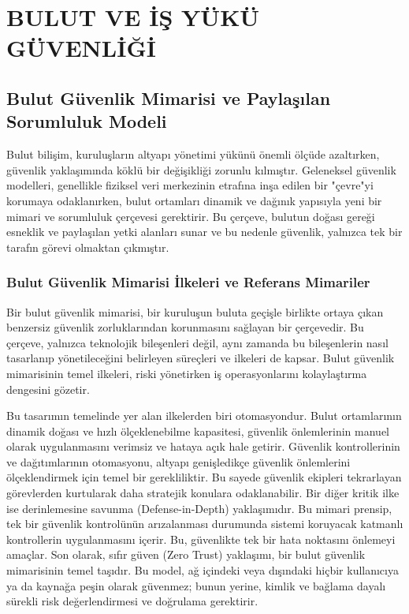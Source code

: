 \chapter{BULUT VE İŞ YÜKÜ GÜVENLİĞİ}

\section{Bulut Güvenlik Mimarisi ve Paylaşılan Sorumluluk Modeli}

Bulut bilişim, kuruluşların altyapı yönetimi yükünü önemli ölçüde azaltırken, güvenlik yaklaşımında köklü bir değişikliği zorunlu kılmıştır. Geleneksel güvenlik modelleri, genellikle fiziksel veri merkezinin etrafına inşa edilen bir "çevre"yi korumaya odaklanırken, bulut ortamları dinamik ve dağınık yapısıyla yeni bir mimari ve sorumluluk çerçevesi gerektirir. Bu çerçeve, bulutun doğası gereği esneklik ve paylaşılan yetki alanları sunar ve bu nedenle güvenlik, yalnızca tek bir tarafın görevi olmaktan çıkmıştır.

\subsection{Bulut Güvenlik Mimarisi İlkeleri ve Referans Mimariler}

Bir bulut güvenlik mimarisi, bir kuruluşun buluta geçişle birlikte ortaya çıkan benzersiz güvenlik zorluklarından korunmasını sağlayan bir çerçevedir. Bu çerçeve, yalnızca teknolojik bileşenleri değil, aynı zamanda bu bileşenlerin nasıl tasarlanıp yönetileceğini belirleyen süreçleri ve ilkeleri de kapsar. Bulut güvenlik mimarisinin temel ilkeleri, riski yönetirken iş operasyonlarını kolaylaştırma dengesini gözetir.

Bu tasarımın temelinde yer alan ilkelerden biri otomasyondur. Bulut ortamlarının dinamik doğası ve hızlı ölçeklenebilme kapasitesi, güvenlik önlemlerinin manuel olarak uygulanmasını verimsiz ve hataya açık hale getirir. Güvenlik kontrollerinin ve dağıtımlarının otomasyonu, altyapı genişledikçe güvenlik önlemlerini ölçeklendirmek için temel bir gerekliliktir. Bu sayede güvenlik ekipleri tekrarlayan görevlerden kurtularak daha stratejik konulara odaklanabilir. Bir diğer kritik ilke ise derinlemesine savunma (Defense-in-Depth) yaklaşımıdır. Bu mimari prensip, tek bir güvenlik kontrolünün arızalanması durumunda sistemi koruyacak katmanlı kontrollerin uygulanmasını içerir. Bu, güvenlikte tek bir hata noktasını önlemeyi amaçlar. Son olarak, sıfır güven (Zero Trust) yaklaşımı, bir bulut güvenlik mimarisinin temel taşıdır. Bu model, ağ içindeki veya dışındaki hiçbir kullanıcıya ya da kaynağa peşin olarak güvenmez; bunun yerine, kimlik ve bağlama dayalı sürekli risk değerlendirmesi ve doğrulama gerektirir.

